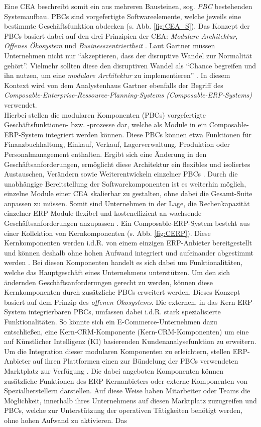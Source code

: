 Eine CEA beschreibt somit ein aus mehreren Bausteinen, sog. \textit{\ac{PBC}} bestehenden Systemaufbau. PBCs sind vorgefertigte Softwareelemente, welche jeweils eine bestimmte Geschäftsfunktion abdecken (s. Abb. \ref{fig:CEA_S}). Das Konzept der PBCs basiert dabei auf den drei Prinzipien der CEA: \textit{Modulare Architektur}, \textit{Offenes Ökosystem} und \textit{Businesszentriertheit} \cite{.20230313}. Laut Gartner müssen Unternehmen nicht nur \enquote{akzeptieren, dass der disruptive Wandel zur Normalität gehört}. Vielmehr sollten diese den disruptiven Wandel als \enquote{Chance begreifen und ihn nutzen, um eine \textit{modulare Architektur} zu implementieren} \cite{.20230313}. In diesem Kontext wird von dem Analystenhaus Gartner ebenfalls der Begriff des \textit{Composable-Enterprise-Ressource-Planning-Systems (Composable-\acs{ERP}-Systems)} verwendet. \\Hierbei stellen die modularen Komponenten (PBCs) vorgefertigte Geschäftsfunktio\-nen- bzw. -prozesse dar, welche als Module in ein Composable-ERP-System integriert werden können. Diese PBCs können etwa Funktionen für Finanzbuchhaltung, Einkauf, Verkauf, Lagerverwaltung, Produktion oder Personalmanagement enthalten. Ergibt sich eine Änderung in den Geschäftsanforderungen, ermöglicht diese Architektur ein flexibles und isoliertes Austauschen, Verändern sowie Weiterentwickeln einzelner PBCs \cite{Gartner.20230418}. Durch die unabhängige Bereitstellung der Softwarekomponenten ist es weiterhin möglich, einzelne Module einer CEA skalierbar zu gestalten, ohne dabei die Gesamt-Suite anpassen zu müssen. Somit sind Unternehmen in der Lage, die Rechenkapazität einzelner ERP-Module flexibel und kosteneffizient an wachsende Geschäftsanforderungen anzupassen \cite[7]{Sensedia.2020}. Ein Composable-ERP-System besteht aus einer Kollektion von Kernkomponenten (s. Abb. \ref{fig:CERP}). Diese Kernkomponenten werden i.d.R. von einem einzigen ERP-Anbieter bereitgestellt und können deshalb ohne hohen Aufwand integriert und aufeinander abgestimmt werden \cite{.d}. Bei diesen Komponenten handelt es sich dabei um Funktionalitäten, welche das Hauptgeschäft eines Unternehmens unterstützen. Um den sich ändernden Geschäftsanforderungen gerecht zu werden, können diese Kernkomponenten durch zusätzliche PBCs erweitert werden. Dieses Konzept basiert auf dem Prinzip des \textit{offenen Ökosystems}. Die externen, in das Kern-ERP-System integrierbaren PBCs, umfassen dabei i.d.R. stark spezialisierte Funktionalitäten. So könnte sich ein E-Commerce-Unternehmen dazu entschließen, eine Kern-\acl{CRM}-Komponente (Kern-CRM-Komponenten) um eine auf Kün\-stlicher Intelligenz (\acs{KI}) basierenden Kundenanalysefunktion zu erweitern. Um die Integration dieser modularen Komponenten zu erleichtern, stellen ERP-Anbieter auf ihren Plattformen einen zur Bündelung der PBCs verwendeten Marktplatz zur Verfügung \cite{.d}. Die dabei angeboten Komponenten können zusätzliche Funktionen des ERP-Kern\-anbieters oder externe Komponenten von Spezialherstellern darstellen. Auf diese Weise haben Mitarbeiter oder Teams die Möglichkeit, innerhalb ihres Unternehmens auf diesen Marktplatz zuzugreifen und PBCs, welche zur Unterstützung der operativen Tätigkeiten benötigt werden, ohne hohen Aufwand zu aktivieren. Das 